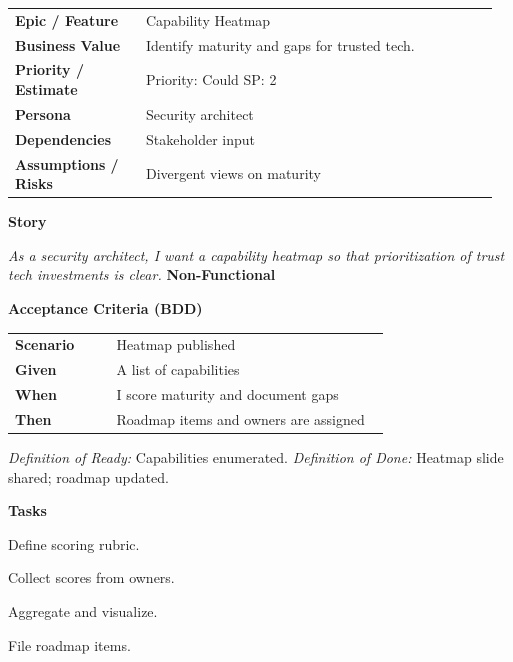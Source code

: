 \documentclass[11pt,letterpaper]{article}
\makeatletter
\newenvironment{kvtable}{%
  \begin{tabular}{@{}>{\bfseries\arraybackslash}p{0.26\linewidth} p{0.70\linewidth}@{}}
}{\end{tabular}}
\newenvironment{bdd}{%
  \begin{tabular}{@{}>{\bfseries\arraybackslash}p{0.26\linewidth} p{0.70\linewidth}@{}}
}{\end{tabular}}
\newcommand{\DoRDoD}[2]{%
  \vspace{0.35em}
  {\footnotesize\color{Muted}%
    \textit{Definition of Ready:} #1 \; \textbullet\;
    \textit{Definition of Done:} #2%
  }%
}
\newenvironment{storycard}[2]{%
  \begin{tcolorbox}[cloudcard, title={#1 --- #2}]%
}{\end{tcolorbox}}
\newcommand{\sectionlabel}[1]{\vspace{0.35em}\textbf{#1}\par}
\makeatother
\begin{document}
\begin{storycard}{CCS-25}{Ch. 25 — Trusted Security Tech: Survey \& Gaps}
\begin{kvtable}
Epic / Feature & Capability Heatmap\\
Business Value & Identify maturity and gaps for trusted tech.\\
Priority / Estimate & Priority: Could \quad SP: 2\\
Persona & Security architect\\
Dependencies & Stakeholder input\\
Assumptions / Risks & Divergent views on maturity\\
\end{kvtable}
\sectionlabel{Story}
\textit{As a security architect, I want a capability heatmap so that prioritization of trust tech investments is clear.}
\sectionlabel{Non-Functional}\;
\sectionlabel{Acceptance Criteria (BDD)}
\begin{bdd}
Scenario & Heatmap published\\
Given & A list of capabilities\\
When & I score maturity and document gaps\\
Then & Roadmap items and owners are assigned\\
\end{bdd}
\DoRDoD{Capabilities enumerated.}{Heatmap slide shared; roadmap updated.}
\sectionlabel{Tasks}
\begin{checklist}
\item Define scoring rubric.
\item Collect scores from owners.
\item Aggregate and visualize.
\item File roadmap items.
\end{checklist}
\end{storycard}
\end{document}
